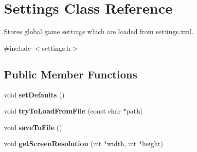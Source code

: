 \hypertarget{classSettings}{
\section{\-Settings \-Class \-Reference}
\label{df/d9a/classSettings}
}


\-Stores global game settings which are loaded from settings.\-xml.  




{\ttfamily \#include $<$settings.\-h$>$}

\subsection*{\-Public \-Member \-Functions}
\begin{DoxyCompactItemize}
\item 
\hypertarget{classSettings_a2109379b05c16983a39b001a5cf0ac26}{
void {\bfseries set\-Defaults} ()}
\label{df/d9a/classSettings_a2109379b05c16983a39b001a5cf0ac26}

\item 
\hypertarget{classSettings_aebf7c18558686c48bdc0b9b3545ff86f}{
void {\bfseries try\-To\-Load\-From\-File} (const char $\ast$path)}
\label{df/d9a/classSettings_aebf7c18558686c48bdc0b9b3545ff86f}

\item 
\hypertarget{classSettings_a327417c3dc611f6ade9c730adc8be1a1}{
void {\bfseries save\-To\-File} ()}
\label{df/d9a/classSettings_a327417c3dc611f6ade9c730adc8be1a1}

\item 
\hypertarget{classSettings_ab9f9f8e2932a0ec640442f6a81b6cf07}{
void {\bfseries get\-Screen\-Resolution} (int $\ast$width, int $\ast$height)}
\label{df/d9a/classSettings_ab9f9f8e2932a0ec640442f6a81b6cf07}

\end{DoxyCompactItemize}

